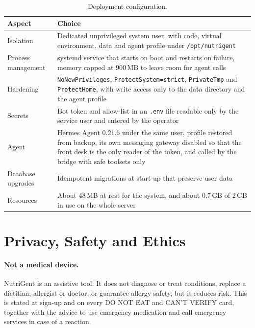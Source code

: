 \documentclass[11pt,a4paper]{article}
\begin{document}
\begin{table}[H]
\centering\small
\caption{Deployment configuration.}
\label{tab:deploy}
\begin{tabularx}{\textwidth}{@{}l Y@{}}
\toprule
Aspect & Choice \\
\midrule
Isolation & Dedicated unprivileged system user, with code, virtual environment, data and agent profile
  under \texttt{/opt/nutrigent} \\
Process management & systemd service that starts on boot and restarts on failure, memory capped at
  900\,MB to leave room for agent calls \\
Hardening & \texttt{NoNewPrivileges}, \texttt{ProtectSystem=strict}, \texttt{PrivateTmp} and
  \texttt{ProtectHome}, with write access only to the data directory and the agent profile \\
Secrets & Bot token and allow-list in an \texttt{.env} file readable only by the service user and
  entered by the operator \\
Agent & Hermes Agent 0.21.6 under the same user, profile restored from backup, its own messaging
  gateway disabled so that the front desk is the only reader of the token, and called by the bridge
  with safe toolsets only \\
Database upgrades & Idempotent migrations at start-up that preserve user data \\
Resources & About 48\,MB at rest for the system, and about 0.7\,GB of 2\,GB in use on the whole server \\
\bottomrule
\end{tabularx}
\end{table}

\section{Privacy, Safety and Ethics}\label{sec:ethics}

\paragraph{Not a medical device.} NutriGent is an assistive tool. It does not diagnose or treat
conditions, replace a dietitian, allergist or doctor, or guarantee allergy safety, but it reduces risk.
This is stated at sign-up and on every DO NOT EAT and CAN'T VERIFY card, together with the advice to use
emergency medication and call emergency services in case of a reaction.
\end{document}
